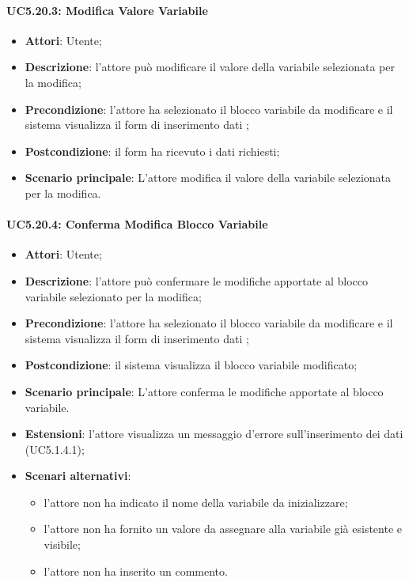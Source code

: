 \paragraph{UC5.20.3: Modifica Valore Variabile}
\label{UC5.20.3}
\begin{itemize}
\item \textbf{Attori}: Utente;
\item \textbf{Descrizione}: l'attore può modificare il valore della variabile selezionata per la modifica;
\item \textbf{Precondizione}: l'attore ha selezionato il blocco variabile da modificare e il sistema visualizza il form di inserimento dati ;	
\item \textbf{Postcondizione}: il form ha ricevuto i dati richiesti;	
\item \textbf{Scenario principale}:
L'attore modifica il valore della variabile selezionata per la modifica.
\end{itemize}	

\paragraph{UC5.20.4: Conferma Modifica Blocco Variabile}
\label{UC5.20.4}
\begin{itemize}
\item \textbf{Attori}: Utente;
\item \textbf{Descrizione}: l'attore può confermare le modifiche apportate al blocco variabile selezionato per la modifica;
\item \textbf{Precondizione}: l'attore ha selezionato il blocco variabile da modificare e il sistema visualizza il form di inserimento dati ;	
\item \textbf{Postcondizione}: il sistema visualizza il blocco variabile modificato;
\item \textbf{Scenario principale}:
L'attore conferma le modifiche apportate al blocco variabile.
\item \textbf{Estensioni}:
l'attore visualizza un messaggio d'errore sull'inserimento dei dati (UC5.1.4.1);	
\item \textbf{Scenari alternativi}:
\begin{itemize}
\item l'attore non ha indicato il nome della variabile da inizializzare;
\item l'attore non ha fornito un valore da assegnare alla variabile già esistente e visibile;
\item l'attore non ha inserito un commento.	
\end{itemize}	
\end{itemize}

